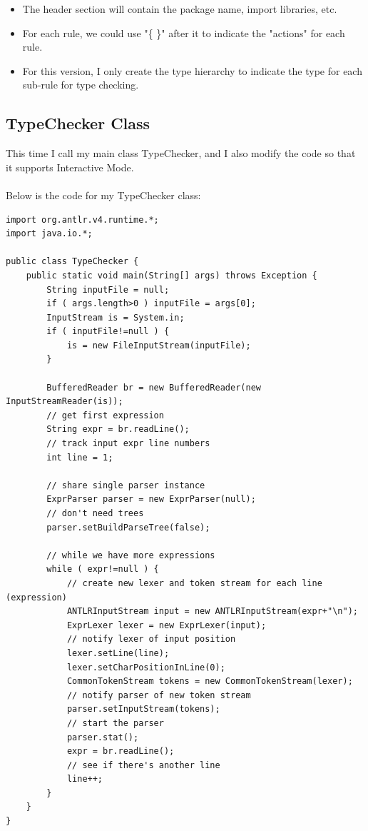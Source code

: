 \documentclass[a4paper,12pt,titlepage]{article}
\begin{document}
\begin{itemize}
	\item The header section will contain the package name, import libraries, etc.
	\item For each rule, we could use "\{ \}" after it to indicate the "actions" for each rule.
	\item For this version, I only create the type hierarchy to indicate the type for each sub-rule for type checking.
\end{itemize}

\subsection {TypeChecker Class}
This time I call my main class {\footnotesize\ttfamily TypeChecker}, and I also modify the code so that it supports {\footnotesize\ttfamily Interactive Mode}.
\\
\\
Below is the code for my  {\footnotesize\ttfamily TypeChecker} class:
\begin{lstlisting}
import org.antlr.v4.runtime.*;
import java.io.*;

public class TypeChecker {
    public static void main(String[] args) throws Exception {
        String inputFile = null;
        if ( args.length>0 ) inputFile = args[0];
        InputStream is = System.in;
        if ( inputFile!=null ) {
            is = new FileInputStream(inputFile);
        }

        BufferedReader br = new BufferedReader(new InputStreamReader(is));
        // get first expression
        String expr = br.readLine(); 
        // track input expr line numbers             
        int line = 1;                             

        // share single parser instance
        ExprParser parser = new ExprParser(null);
        // don't need trees
        parser.setBuildParseTree(false);          

        // while we have more expressions
        while ( expr!=null ) {             
            // create new lexer and token stream for each line (expression)
            ANTLRInputStream input = new ANTLRInputStream(expr+"\n");
            ExprLexer lexer = new ExprLexer(input);
            // notify lexer of input position
            lexer.setLine(line);           
            lexer.setCharPositionInLine(0);
            CommonTokenStream tokens = new CommonTokenStream(lexer);
            // notify parser of new token stream
            parser.setInputStream(tokens);
            // start the parser 
            parser.stat();                 
            expr = br.readLine();
            // see if there's another line          
            line++;
        }
    }
}
\end{lstlisting}
\end{document}
